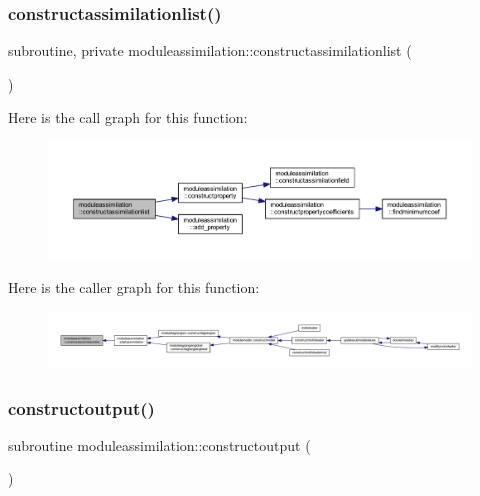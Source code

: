 \subsubsection{\texorpdfstring{constructassimilationlist()}{constructassimilationlist()}}
{\footnotesize\ttfamily subroutine, private moduleassimilation\+::constructassimilationlist (\begin{DoxyParamCaption}{ }\end{DoxyParamCaption})\hspace{0.3cm}{\ttfamily [private]}}

Here is the call graph for this function\+:\nopagebreak
\begin{figure}[H]
\begin{center}
\leavevmode
\includegraphics[width=350pt]{namespacemoduleassimilation_a6f4678dd5995e947ccdc126f9abf9f6c_cgraph}
\end{center}
\end{figure}
Here is the caller graph for this function\+:\nopagebreak
\begin{figure}[H]
\begin{center}
\leavevmode
\includegraphics[width=350pt]{namespacemoduleassimilation_a6f4678dd5995e947ccdc126f9abf9f6c_icgraph}
\end{center}
\end{figure}
\mbox{\label{namespacemoduleassimilation_a0290dba29cfc2f2e50954134308fdd93}} 
\subsubsection{\texorpdfstring{constructoutput()}{constructoutput()}}
{\footnotesize\ttfamily subroutine moduleassimilation\+::constructoutput (\begin{DoxyParamCaption}{ }\end{DoxyParamCaption})\hspace{0.3cm}{\ttfamily [private]}}

